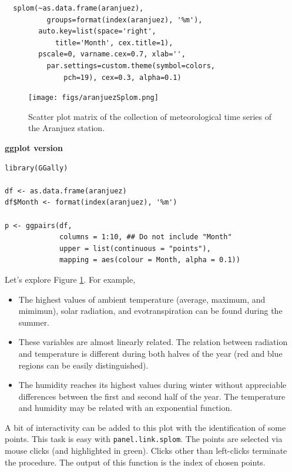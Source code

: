 \documentclass[smallroyalvopaper]{memoir}
\begin{document}
\lstset{language=r,label= ,caption= ,captionpos=b,numbers=none}
\begin{lstlisting}
  splom(~as.data.frame(aranjuez),
          groups=format(index(aranjuez), '%m'),
        auto.key=list(space='right', 
            title='Month', cex.title=1),
        pscale=0, varname.cex=0.7, xlab='',
          par.settings=custom.theme(symbol=colors,
              pch=19), cex=0.3, alpha=0.1)
\end{lstlisting}

\begin{figure}[htbp]
\centering
\texttt{[image: figs/aranjuezSplom.png]}
\caption{Scatter plot matrix of the collection of meteorological time series of the Aranjuez station. \label{fig:aranjuezSplom}}
\end{figure}

\textbf{ggplot version}

\lstset{language=r,label= ,caption= ,captionpos=b,numbers=none}
\begin{lstlisting}
library(GGally)

df <- as.data.frame(aranjuez)
df$Month <- format(index(aranjuez), '%m')
 
p <- ggpairs(df,
             columns = 1:10, ## Do not include "Month"
             upper = list(continuous = "points"),
             mapping = aes(colour = Month, alpha = 0.1))
\end{lstlisting}

Let's explore Figure \ref{fig:aranjuezSplom}. For example,
\begin{itemize}
\item The highest values of ambient temperature (average, maximum, and
mimimun), solar radiation, and evotranspiration can be found
during the summer.
\item These variables are almost linearly related. The relation
between radiation and temperature is different during both
halves of the year (red and blue regions can be easily distinguished).
\item The humidity reaches its highest values during winter without
appreciable differences between the first and second half of the
year. The temperature and humidity may be related with an
exponential function.
\end{itemize}

A bit of interactivity can be added to this plot with the
identification of some points. This task is easy with
\texttt{panel.link.splom}. The points are selected via mouse clicks (and
highlighted in green). Clicks other than left-clicks terminate the
procedure. The output of this function is the index of chosen
points.
\end{document}
